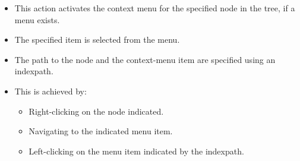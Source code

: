 \begin{itemize}
\item This action activates the context menu for the specified node in the tree, if a menu exists.
\item The specified item is  selected from the menu.
\item The path to the node and the context-menu item are specified using an indexpath.
\item This is achieved by:
  \begin{itemize}
    \item Right-clicking on the node indicated.
    \item Navigating to the indicated menu item.
    \item Left-clicking on the menu item indicated by the indexpath.
  \end{itemize}
\end{itemize}
 
